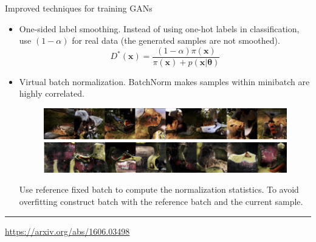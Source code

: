 \documentclass{beamer}
\newcommand{\bx}{\mathbf{x}}
\newcommand{\btheta}{\boldsymbol{\theta}}
\begin{document}
\begin{frame}{Improved techniques for training GANs}
	\begin{itemize}
		\item One-sided label smoothing. Instead of using one-hot labels in classification, use $(1 - \alpha)$ for real data (the generated samples are not smoothed).
		\[
			D^*(\bx) = \frac{(1 - \alpha )\pi(\bx)}{\pi(\bx) + p(\bx | \btheta)}
		\]
		\item Virtual batch normalization. BatchNorm makes samples within minibatch are highly correlated.
		\begin{figure}
			\centering
			\includegraphics[width=0.6\linewidth]{figs/virtual_batch_norm}
		\end{figure}
	Use reference fixed batch to compute the normalization statistics. To avoid overfitting construct batch with the reference batch and the current sample. 
	\end{itemize}
	\vfill
	\hrule\medskip
	{\scriptsize \href{https://arxiv.org/abs/1606.03498}{https://arxiv.org/abs/1606.03498}}
\end{frame}
\end{document}
